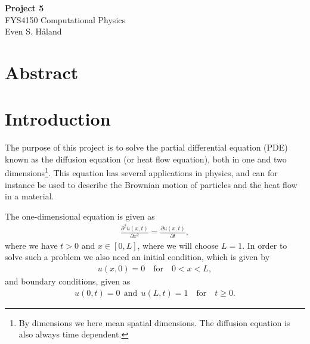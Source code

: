 \documentclass[12pt, a4paper]{article}
\begin{document}
\begin{titlepage}
\begin{center}
\vspace*{3cm}
\Huge
\textbf{Project 5} \\
\Large  
FYS4150 Computational Physics 
\vspace*{3cm} \\ 

Even S. Håland 
\vspace*{5cm} \\

\normalsize
\section*{Abstract}


\end{center}
\end{titlepage}

\section{Introduction}

The purpose of this project is to solve the partial differential equation (PDE) known as the 
diffusion equation (or heat flow equation), both in one and two dimensions\footnote{By  
dimensions we here mean spatial dimensions. The diffusion equation is also always time dependent.}. 
This equation has several applications in physics, and can for instance be used to describe the 
Brownian motion of particles and the heat flow in a material.   

The one-dimensional equation is given as 
\begin{align}
\frac{\partial ^2 u(x,t)}{\partial x^2} = \frac{\partial u(x,t)}{\partial t}, 
\label{eq:1d}
\end{align} 
where we have $t>0$ and $x\in [0,L]$, where we will choose $L=1$. In order to solve such a problem we 
also need an initial condition, which is given by 
\begin{align*}
u(x,0) = 0 \quad \text{for}  \quad 0<x<L, 
\end{align*} 
and boundary conditions, given as 
\begin{align*}
u(0,t) = 0 \:\: \text{and} \:\: u(L,t)=1 \quad \text{for} \quad t\geq 0.  
\end{align*}
\end{document}
